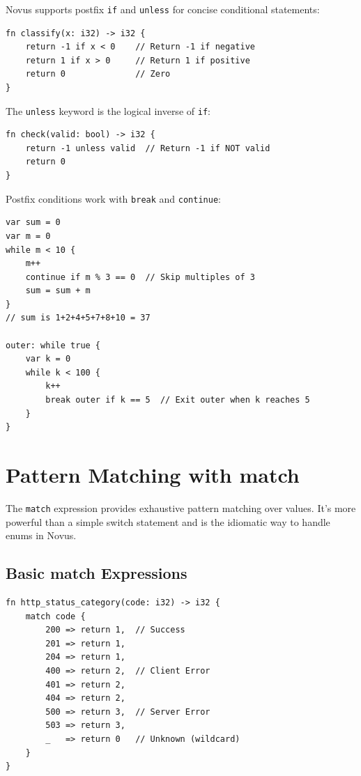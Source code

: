 Novus supports postfix \texttt{if} and \texttt{unless} for concise conditional statements:

\begin{lstlisting}
fn classify(x: i32) -> i32 {
    return -1 if x < 0    // Return -1 if negative
    return 1 if x > 0     // Return 1 if positive
    return 0              // Zero
}
\end{lstlisting}

The \texttt{unless} keyword is the logical inverse of \texttt{if}:

\begin{lstlisting}
fn check(valid: bool) -> i32 {
    return -1 unless valid  // Return -1 if NOT valid
    return 0
}
\end{lstlisting}

Postfix conditions work with \texttt{break} and \texttt{continue}:

\begin{lstlisting}
var sum = 0
var m = 0
while m < 10 {
    m++
    continue if m % 3 == 0  // Skip multiples of 3
    sum = sum + m
}
// sum is 1+2+4+5+7+8+10 = 37

outer: while true {
    var k = 0
    while k < 100 {
        k++
        break outer if k == 5  // Exit outer when k reaches 5
    }
}
\end{lstlisting}

\section{Pattern Matching with match}
\label{sec:match}

The \texttt{match} expression provides exhaustive pattern matching over values. It's more powerful than a simple switch statement and is the idiomatic way to handle enums in Novus.

\subsection{Basic match Expressions}
\label{subsec:match-basics}

\begin{lstlisting}
fn http_status_category(code: i32) -> i32 {
    match code {
        200 => return 1,  // Success
        201 => return 1,
        204 => return 1,
        400 => return 2,  // Client Error
        401 => return 2,
        404 => return 2,
        500 => return 3,  // Server Error
        503 => return 3,
        _   => return 0   // Unknown (wildcard)
    }
}
\end{lstlisting}

